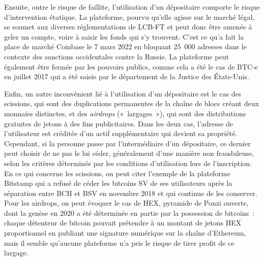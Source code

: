 Ensuite, outre le risque de faillite, l'utilisation d'un dépositaire comporte le risque d'intervention étatique. La plateforme, pourvu qu'elle agisse sur le marché légal, se soumet aux diverses réglementations de LCB-FT et peut donc être amenée à geler un compte, voire à saisir les fonds qui s'y trouvent. C'est ce qu'a fait la place de marché Coinbase le 7 mars 2022 en bloquant 25~000 adresses dans le contexte des sanctions occidentales contre la Russie. La plateforme peut également être fermée par les pouvoirs publics, comme cela a été le cas de BTC-e en juillet 2017 qui a été saisie par le département de la Justice des États-Unis.

Enfin, un autre inconvénient lié à l'utilisation d'un dépositaire est le cas des scissions, qui sont des duplications permanentes de la chaîne de blocs créant deux monnaies distinctes, et des \emph{airdrops} («~largages~»), qui sont des distributions gratuites de jetons à des fins publicitaires. Dans les deux cas, l'adresse de l'utilisateur est créditée d'un actif supplémentaire qui devient sa propriété. Cependant, si la personne passe par l'intermédiaire d'un dépositaire, ce dernier peut choisir de ne pas le lui céder, généralement d'une manière non frauduleuse, selon les critères déterminés par les conditions d'utilisation lors de l'inscription. En ce qui concerne les scissions, on peut citer l'exemple de la plateforme Bitstamp qui a refusé de céder les bitcoins SV de ses utilisateurs après la séparation entre BCH et BSV en novembre 2018 et qui continue de les conserver. Pour les airdrops, on peut évoquer le cas de HEX, pyramide de Ponzi ouverte, dont la genèse en 2020 a été déterminée en partie par la possession de bitcoins~: chaque détenteur de bitcoin pouvait prétendre à un montant de jetons HEX proportionnel en publiant une signature numérique sur la chaîne d'Ethereum, mais il semble qu'aucune plateforme n'a pris le risque de tirer profit de ce largage.

